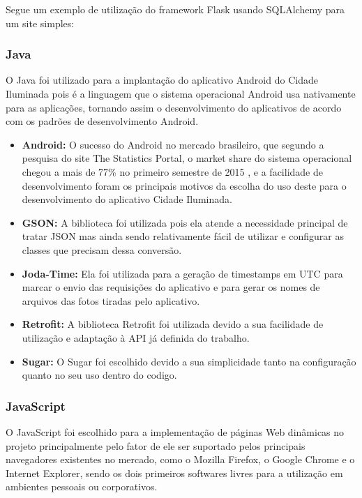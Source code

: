 \documentclass[
	article,			%
	11pt,				%
	oneside,			%
	a4paper,			%
	english,			%
	brazil,				%
	sumario=tradicional
	]{abntex2}
\begin{document}
Segue um exemplo de utilização do framework Flask usando SQLAlchemy para um site simples:

%

\subsubsection{Java}

O Java foi utilizado para a implantação do aplicativo Android do Cidade Iluminada pois é a linguagem que o sistema operacional Android usa nativamente para as aplicações, tornando assim o desenvolvimento do aplicativos de acordo com os padrões de desenvolvimento Android.

\begin{itemize}
\item \textbf{Android:} O sucesso do Android no mercado brasileiro, que segundo a pesquisa do site The Statistics Portal, o market share do sistema operacional chegou a mais de 77\% no primeiro semestre de 2015 \cite{statista}, e a facilidade de desenvolvimento foram os principais motivos da escolha do uso deste para o desenvolvimento do aplicativo Cidade Iluminada.

\item \textbf{GSON:} A biblioteca foi utilizada pois ela atende a necessidade principal de tratar JSON mas ainda sendo relativamente fácil de utilizar e configurar as classes que precisam dessa conversão.

\item \textbf{Joda-Time:} Ela foi utilizada para a geração de timestamps em UTC para marcar o envio das requisições do aplicativo e para gerar os nomes de arquivos das fotos tiradas pelo aplicativo.

\item \textbf{Retrofit:} A biblioteca Retrofit foi utilizada devido a sua facilidade de utilização e adaptação à API já definida do trabalho.

\item \textbf{Sugar:} O Sugar foi escolhido devido a sua simplicidade tanto na configuração quanto no seu uso dentro do codigo.

\end{itemize}

\subsubsection{JavaScript}

O JavaScript foi escolhido para a implementação de páginas Web dinâmicas no projeto principalmente pelo fator de ele ser suportado pelos principais navegadores existentes no mercado, como o Mozilla Firefox, o Google Chrome e o Internet Explorer, sendo os dois primeiros softwares livres para a utilização em ambientes pessoais ou corporativos.
\end{document}
